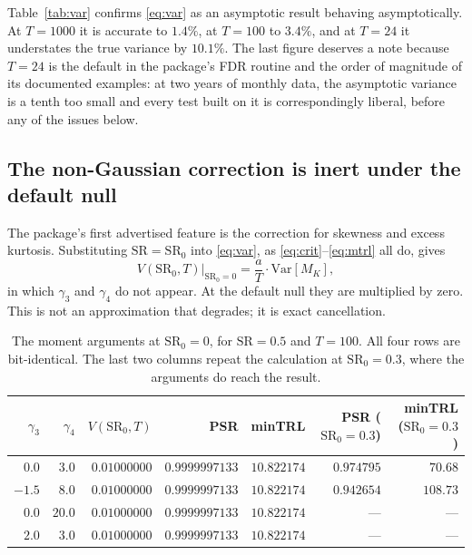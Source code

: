 \documentclass[11pt,a4paper]{article}
\newcommand{\SR}{\mathrm{SR}}
\begin{document}
Table~\ref{tab:var} confirms \eqref{eq:var} as an asymptotic result behaving
asymptotically. At $T = 1000$ it is accurate to $1.4\%$, at $T = 100$ to
$3.4\%$, and at $T = 24$ it understates the true variance by $10.1\%$. The
last figure deserves a note because $T = 24$ is the default in the package's
FDR routine and the order of magnitude of its documented examples: at two
years of monthly data, the asymptotic variance is a tenth too small and every
test built on it is correspondingly liberal, before any of the issues below.

\subsection{The non-Gaussian correction is inert under the default null}
\label{sec:inert}

The package's first advertised feature is the correction for skewness and
excess kurtosis. Substituting $\SR = \SR_0$ into \eqref{eq:var}, as
\eqref{eq:crit}--\eqref{eq:mtrl} all do, gives
\begin{equation}
  V(\SR_0, T)\big|_{\SR_0 = 0} = \frac{a}{T} \cdot \mathrm{Var}[M_K],
\end{equation}
in which $\gamma_3$ and $\gamma_4$ do not appear. At the default null they are
multiplied by zero. This is not an approximation that degrades; it is exact
cancellation.

\begin{table}[t]
\centering
\caption{The moment arguments at $\SR_0 = 0$, for $\SR = 0.5$ and $T = 100$.
All four rows are bit-identical. The last two columns repeat the calculation
at $\SR_0 = 0.3$, where the arguments do reach the result.}
\label{tab:inert}
\begin{tabular}{rrrrrrr}
\toprule
$\gamma_3$ & $\gamma_4$ & $V(\SR_0, T)$ & PSR & minTRL & PSR ($\SR_0{=}0.3$) & minTRL ($\SR_0{=}0.3$) \\
\midrule
$0.0$  & $3.0$  & $0.01000000$ & $0.9999997133$ & $10.822174$ & $0.974795$ & $70.68$ \\
$-1.5$ & $8.0$  & $0.01000000$ & $0.9999997133$ & $10.822174$ & $0.942654$ & $108.73$ \\
$0.0$  & $20.0$ & $0.01000000$ & $0.9999997133$ & $10.822174$ & --- & --- \\
$2.0$  & $3.0$  & $0.01000000$ & $0.9999997133$ & $10.822174$ & --- & --- \\
\bottomrule
\end{tabular}
\end{table}
\end{document}
